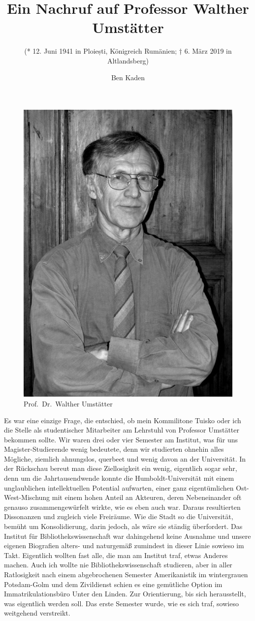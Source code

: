 \documentclass[a4paper,
fontsize=11pt,
oneside,
numbers=noperiodatend,
parskip=half-,
bibliography=totoc,
final
]{scrartcl}
\title{\LARGE{Ein Nachruf auf Professor Walther Umstätter}}%
\subtitle{(* 12. Juni 1941 in Ploiești, Königreich Rumänien; † 6. März 2019 in Altlandsberg)}
\author{Ben Kaden} %
\date{}
\begin{document}
\maketitle
\thispagestyle{fancyplain} 


\begin{figure}[h]
\centering
\includegraphics[width=.5\textwidth]{img/umstaetter.png}
\caption{Prof.~Dr.~Walther Umstätter}
\end{figure}

Es war eine einzige Frage, die entschied, ob mein Kommilitone Tuisko
oder ich die Stelle als studentischer Mitarbeiter am Lehrstuhl von
Professor Umstätter bekommen sollte. Wir waren drei oder vier Semester
am Institut, was für uns Magister-Studierende wenig bedeutete, denn wir
studierten ohnehin alles Mögliche, ziemlich ahnungslos, querbeet und
wenig davon an der Universität. In der Rückschau bereut man diese
Ziellosigkeit ein wenig, eigentlich sogar sehr, denn um die
Jahrtausendwende konnte die Humboldt-Universität mit einem unglaublichen
intellektuellen Potential aufwarten, einer ganz eigentümlichen
Ost-West-Mischung mit einem hohen Anteil an Akteuren, deren
Nebeneinander oft genauso zusammengewürfelt wirkte, wie es eben auch
war. Daraus resultierten Dissonanzen und zugleich viele Freiräume. Wie
die Stadt so die Universität, bemüht um Konsolidierung, darin jedoch,
als wäre sie ständig überfordert. Das Institut für
Bibliothekswissenschaft war dahingehend keine Ausnahme und unsere
eigenen Biografien alters- und naturgemäß zumindest in dieser Linie
sowieso im Takt. Eigentlich wollten fast alle, die man am Institut traf,
etwas Anderes machen. Auch ich wollte nie Bibliothekswissenschaft
studieren, aber in aller Ratlosigkeit nach einem abgebrochenen Semester
Amerikanistik im wintergrauen Potsdam-Golm und dem Zivildienst schien es
eine gemütliche Option im Immatrikulationsbüro Unter den Linden. Zur
Orientierung, bis sich herausstellt, was eigentlich werden soll. Das
erste Semester wurde, wie es sich traf, sowieso weitgehend verstreikt.
\end{document}
